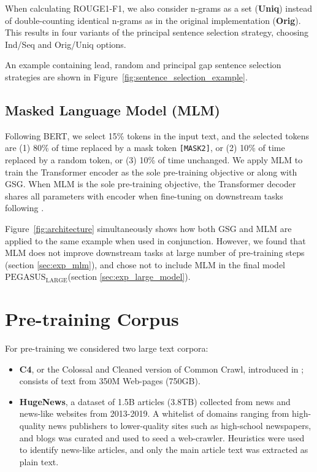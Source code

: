\documentclass{article}
\newcommand\pegasuslarge{$\text{PEGASUS}_{\text{LARGE}}$\xspace}
\newcommand\gnews{HugeNews\xspace}
\begin{document}
When calculating ROUGE1-F1, we also consider n-grams as a set (\textbf{Uniq}) instead of double-counting identical n-grams
as in the original implementation (\textbf{Orig}). 
This results in four variants of the principal sentence selection strategy, choosing Ind/Seq and Orig/Uniq options. 

An example containing lead, random and principal gap sentence selection strategies are shown in Figure~\ref{fig:sentence_selection_example}. 




\subsection{Masked Language Model (MLM)}
\label{sec:mlm}
Following BERT, we select 15\% tokens in the input text, and the selected tokens are (1) 80\% of time replaced by a mask token \texttt{[MASK2]},
or (2) 10\% of time replaced by a random token, or (3) 10\% of time unchanged. 
We apply MLM to train the Transformer encoder as the sole pre-training objective or along with GSG. When MLM is the sole pre-training objective, the Transformer decoder shares all parameters with encoder when fine-tuning on downstream tasks following \citet{rothe2019leveraging}.


Figure~\ref{fig:architecture}
simultaneously shows how both
GSG and MLM are applied to the same example
when used in conjunction.
However, we found that MLM does not improve downstream tasks at large number of pre-training steps (section \ref{sec:exp_mlm}), and chose not to include MLM in the final model \pegasuslarge (section \ref{sec:exp_large_model}).


\section{Pre-training Corpus}
For pre-training we considered two large text corpora:
\begin{itemize}
    \item \textbf{C4}, or the Colossal and Cleaned version of Common Crawl,   introduced in \citet{raffel2019exploring}; consists of text from  350M Web-pages (750GB).
    \item  \textbf{\gnews}, a dataset of 1.5B articles (3.8TB) collected from news
    and news-like websites from 2013-2019. A whitelist of domains
    ranging from high-quality news publishers to lower-quality
    sites such as high-school newspapers, and blogs was 
    curated and used to seed a web-crawler. Heuristics were used to 
    identify news-like articles, and only the main article
    text was extracted as plain text.
\end{itemize}
\end{document}
